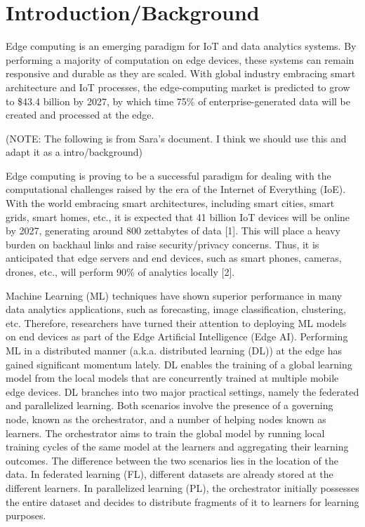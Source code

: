 \documentclass[../mthe-493-project-proposal.tex]{subfiles}
\begin{document}
    \chapter{Introduction/Background}
    \label{ch:introduction}

    Edge computing is an emerging paradigm for IoT and data analytics systems. By performing a majority of computation on edge devices, these systems can remain responsive and durable as they are scaled. With global industry embracing smart architecture and IoT processes, the edge-computing market is predicted to grow to \$43.4 billion by 2027, by which time 75\% of enterprise-generated data will be created and processed at the edge.

    (NOTE: The following is from Sara's document. I think we should use this and adapt it as a intro/background)~\cite{noauthor_edge_2020}

    Edge computing is proving to be a successful paradigm for dealing with the computational challenges raised by the era of the Internet of Everything (IoE). With the world embracing smart architectures, including smart cities, smart grids, smart homes, etc., it is expected that 41 billion IoT devices will be online by 2027, generating around 800 zettabytes of data [1]. This will place a heavy burden on backhaul links and raise security/privacy concerns. Thus, it is anticipated that edge servers and end devices, such as smart phones, cameras, drones, etc., will perform 90\% of analytics locally [2].

    Machine Learning (ML) techniques have shown superior performance in many data analytics applications, such as forecasting, image classification, clustering, etc. Therefore, researchers have turned their attention to deploying ML models on end devices as part of the Edge Artificial Intelligence (Edge AI). Performing ML in a distributed manner (a.k.a. distributed learning (DL)) at the edge has gained significant momentum lately. DL enables the training of a global learning model from the local models that are concurrently trained at multiple mobile edge devices. DL branches into two major practical settings, namely the federated and parallelized learning. Both scenarios involve the presence of a governing node, known as the orchestrator, and a number of helping nodes known as learners. The orchestrator aims to train the global model by running local training cycles of the same model at the learners and aggregating their learning outcomes. The difference between the two scenarios lies in the location of the data. In federated learning (FL), different datasets are already stored at the different learners. In parallelized learning (PL), the orchestrator initially possesses the entire dataset and decides to distribute fragments of it to learners for learning purposes.
\end{document}
